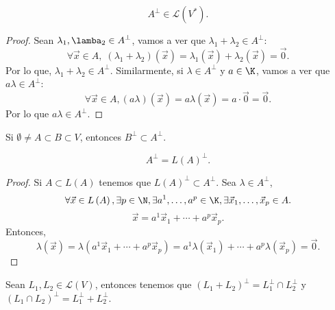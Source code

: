 \begin{fprop}[]
\normalfont 
\[A^{\perp} \in \mathcal{L}\left(V^{*}\right) .\]
\end{fprop}

\begin{proof}
Sean $\displaystyle \lambda_{1}, \lamba_{2} \in A^{\perp} $, vamos a ver que $\displaystyle \lambda_{1} + \lambda _{2} \in A^{\perp} $:
\[\forall\vec{x} \in A, \; \left(\lambda_{1}+\lambda_{2}\right)\left(\vec{x}\right) = \lambda_{1}\left(\vec{x}\right) + \lambda_{2}\left(\vec{x}\right) = \vec{0} .\]
Por lo que, $\displaystyle \lambda_{1} + \lambda_{2} \in A^{\perp} $. Similarmente, si $\displaystyle \lambda \in A^{\perp} $ y $\displaystyle a \in \K $, vamos a ver que $\displaystyle a\lambda \in A^{\perp} $:
\[\forall\vec{x} \in A, \left(a\lambda\right)\left(\vec{x}\right) = a\lambda\left(\vec{x}\right) = a \cdot \vec{0} = \vec{0} .\]
Por lo que $\displaystyle a\lambda \in A^{\perp} $.
\end{proof}

\begin{fprop}[]
\normalfont Si $\displaystyle \emptyset \neq A \subset B \subset V $, entonces $\displaystyle B^{\perp} \subset A^{\perp} $.
\end{fprop}

\begin{fprop}[]
\normalfont 
\[A^{\perp} = L\left(A\right)^{\perp} .\]
\end{fprop}

\begin{proof}
Si $\displaystyle A \subset L\left(A\right) $ tenemos que $\displaystyle L\left(A\right)^{\perp} \subset A^{\perp} $. Sea $\displaystyle \lambda \in A^{\perp} $, 
\[\forall \vec{x}\in L\left(A\right), \exists p \in \N, \exists a^{1}, \ldots, a^{p} \in \K, \exists \vec{x}_{1}, \ldots, \vec{x}_{p} \in A .\]
\[\vec{x} = a^{1}\vec{x}_{1}+\cdots + a^{p}\vec{x}_{p} .\]
Entonces, 
\[\lambda\left(\vec{x}\right) = \lambda\left(a^{1}\vec{x}_{1}+\cdots + a^{p}\vec{x}_{p}\right) = a^{1}\lambda\left(\vec{x}_{1}\right)+\cdots + a^{p}\lambda\left(\vec{x}_{p}\right) = \vec{0} .\]
\end{proof}

\begin{fprop}[]
\normalfont Sean $\displaystyle L_{1}, L_{2} \in \mathcal{L}\left(V\right) $, entonces tenemos que $\displaystyle \left(L_{1}+L_{2}\right)^{\perp} = L_{1}^{\perp} \cap L_{2}^{\perp} $ y $\displaystyle \left(L_{1}\cap L_{2}\right)^{\perp} = L_{1}^{\perp} + L_{2}^{\perp} $. 
\end{fprop}

